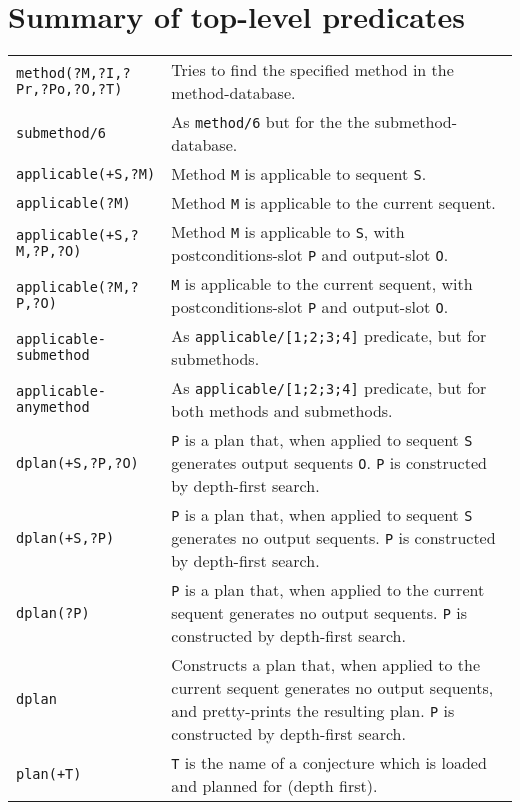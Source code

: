 \def\rcsid{$Id: summary.tex,v 1.6 1999/03/31 13:38:06 img Exp $}


\iffalse
\section {Summary of top-level predicates}
\label{top-level-preds}


{\small

\begin{supertabular}{@{}lp{.5\textwidth}@{}}
{\tt method(?M,?I,?Pr,?Po,?O,?T)} & Tries to find the specified method in
		the method-database.\\
{\tt submethod/6} & As {\tt method/6} but for the the submethod-database.\\\hline
{\tt applicable(+S,?M)} & Method {\tt M} is applicable to sequent {\tt S}.\\
{\tt applicable(?M)} & Method {\tt M} is applicable to the current sequent. \\
{\tt applicable(+S,?M,?P,?O)} & Method {\tt M} is applicable to {
		\tt S}, with postconditions-slot {\tt P} and
		output-slot {\tt O}. \\ 
{\tt applicable(?M,?P,?O)} & {\tt M} is
		applicable to the current sequent, with
		postconditions-slot {\tt P} and output-slot {\tt O}.\\
{\tt applicable-submethod} & As 
		{\tt applicable/[1;2;3;4]} predicate, but for submethods.\\
{\tt applicable-anymethod} & As 
		{\tt applicable/[1;2;3;4]} predicate, but for
		both methods and submethods.\\ 
\hline
{\tt dplan(+S,?P,?O)} & {\tt P} is a plan that, when applied to
		sequent {\tt S} generates output sequents {\tt O}.
		{\tt P} is constructed by depth-first search. \\
{\tt dplan(+S,?P)} & {\tt P} is a plan that, when applied to sequent {
		\tt S} generates no output sequents.
		{\tt P} is constructed by depth-first search. \\
{\tt dplan(?P)} & {\tt P} is a plan that, when applied to the current
		sequent generates no output sequents.
		{\tt P} is constructed by depth-first search. \\
{\tt dplan} & Constructs a plan that, when applied to the current
		sequent generates no output sequents, and pretty-prints the
		resulting plan.
		{\tt P} is constructed by depth-first search.\\
{\tt plan(+T)}  & {\tt T} is the name of a conjecture which is
                  loaded and planned for (depth first). \\

\end{supertabular}}
